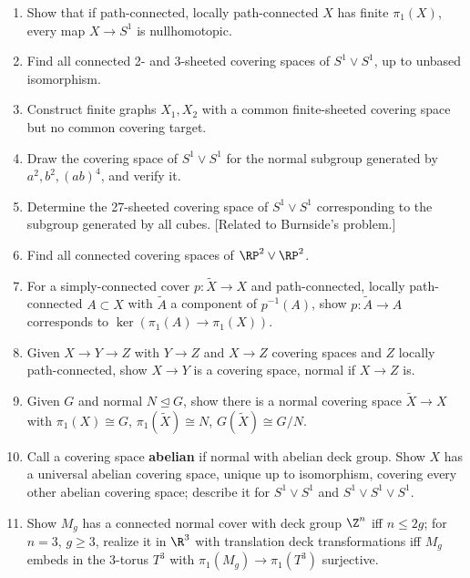 \begin{enumerate}
\item Show that if path-connected, locally path-connected $X$ has finite
$\pi_1(X)$, every map $X\to S^1$ is nullhomotopic.

\item Find all connected 2- and 3-sheeted covering spaces of $S^1\vee S^1$, up to
unbased isomorphism.

\item Construct finite graphs $X_1,X_2$ with a common finite-sheeted covering
space but no common covering target.

\item Draw the covering space of $S^1\vee S^1$ for the normal subgroup generated
by $a^2,b^2,(ab)^4$, and verify it.

\item Determine the 27-sheeted covering space of $S^1\vee S^1$ corresponding to
the subgroup generated by all cubes. [Related to Burnside's problem.]

\item Find all connected covering spaces of $\RP^2\vee\RP^2$.

\item For a simply-connected cover $p:\tilde X\to X$ and path-connected, locally
path-connected $A\subset X$ with $\tilde A$ a component of $p^{-1}(A)$, show
$p:\tilde A\to A$ corresponds to $\ker(\pi_1(A)\to\pi_1(X))$.

\item Given $X\to Y\to Z$ with $Y\to Z$ and $X\to Z$ covering spaces and $Z$
locally path-connected, show $X\to Y$ is a covering space, normal if $X\to Z$ is.

\item Given $G$ and normal $N\trianglelefteq G$, show there is a normal covering
space $\tilde X\to X$ with $\pi_1(X)\cong G$, $\pi_1(\tilde X)\cong N$,
$G(\tilde X)\cong G/N$.

\item Call a covering space \textbf{abelian} if normal with abelian deck group. Show
$X$ has a universal abelian covering space, unique up to isomorphism, covering
every other abelian covering space; describe it for $S^1\vee S^1$ and
$S^1\vee S^1\vee S^1$.

\item Show $M_g$ has a connected normal cover with deck group $\Z^n$ iff
$n\le 2g$; for $n=3$, $g\ge3$, realize it in $\R^3$ with translation deck
transformations iff $M_g$ embeds in the 3-torus $T^3$ with $\pi_1(M_g)\to\pi_1(T^3)$
surjective.


\end{enumerate}
